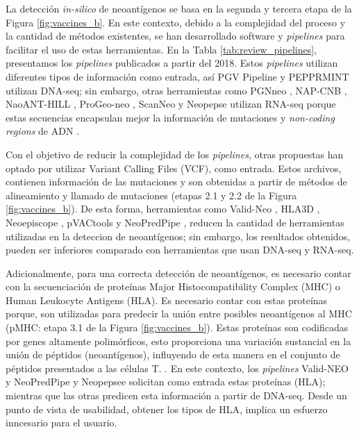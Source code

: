 \documentclass[a4paper]{article}
\begin{document}
	
La detección \textit{in-silico} de neoantígenos se basa en la segunda y tercera etapa de la Figura \ref{fig:vaccines_b}. En este contexto, debido a la complejidad del proceso y la cantidad de métodos existentes, se han desarrollado software y \textit{pipelines} para facilitar el uso de estas herramientas. En la Tabla \ref{tab:review_pipelines}, presentamos los \textit{pipelines} publicados a partir del 2018. Estos \textit{pipelines} utilizan diferentes tipos de información como entrada, así PGV Pipeline \citep{rubinsteyn2018computational} y PEPPRMINT \citep{zhou2023prioritizing} utilizan DNA-seq; sin embargo, otras herramientas como PGNneo \citep{tan2023pgnneo}, NAP-CNB \citep{wert2021predicting}, NaoANT-HILL \citep{coelho2020neoant}, ProGeo-neo \citep{li2020progeo}, ScanNeo \citep{wang2019scanneo} y Neopepse \citep{kim2018neopepsee} utilizan RNA-seq porque estas secuencias encapsulan mejor la información de mutaciones y \textit{non-coding regions} de ADN \citep{tan2023pgnneo}. 

Con el objetivo de reducir la complejidad de los \textit{pipelines}, otras propuestas han optado por utilizar Variant Calling Files (VCF), como entrada. Estos archivos, contienen información de las mutaciones y son obtenidas a partir de métodos de alineamiento y llamado de mutaciones (etapas 2.1 y 2.2 de la Figura \ref{fig:vaccines_b}). De esta forma, herramientas como Valid-Neo \citep{terai2022valid}, HLA3D \citep{li2022hla3d}, Neoepiscope \citep{wood2020neoepiscope} , pVACtools \citep{hundal2020pvactools} y NeoPredPipe \citep{schenck2019neopredpipe}, reducen la cantidad de herramientas utilizadas en la deteccion de neoantígenos; sin embargo, los resultados obtenidos, pueden ser inferiores comparado con herramientas que usan DNA-seq y RNA-seq.

Adicionalmente, para una correcta detección de neoantígenos, es necesario contar con la secuenciación de proteínas Major Histocompatibility Complex (MHC) o Human Leukocyte Antigens (HLA). Es necesario contar con estas proteínas porque, son utilizadas para predecir la unión entre posibles neoantígenos al MHC (pMHC: etapa 3.1 de la Figura \ref{fig:vaccines_b}). Estas proteínas son codificadas por genes altamente polimórficos, esto proporciona una variación sustancial en la unión de péptidos (neoantígenos), influyendo de esta manera en el conjunto de péptidos presentados a las células T. \citep{abualrous2021major}. En este contexto,  los \textit{pipelines} Valid-NEO \citep{terai2022valid}  y NeoPredPipe \citep{schenck2019neopredpipe} y Neopepsee \citep{kim2018neopepsee} solicitan como entrada estas proteínas (HLA); mientras que las otras predicen esta información a partir de DNA-seq. Desde un punto de vista de usabilidad, obtener los tipos de HLA, implica un esfuerzo inncesario para el usuario.
\end{document}
